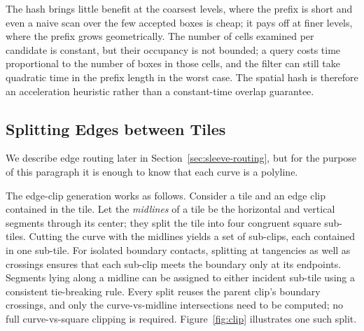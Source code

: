 \documentclass[review]{vgtc}          %
\begin{document}
The hash brings little benefit at the coarsest levels, where the
prefix is short and even a naive scan over the few accepted boxes is
cheap; it pays off at finer levels, where the prefix grows
geometrically. The number of cells examined per candidate is
constant, but their occupancy is not bounded; a query costs time
proportional to the number of boxes in those cells, and the filter
can still take quadratic time in the prefix length in the worst case.
The spatial hash is therefore an acceleration heuristic rather than
a constant-time overlap guarantee.


\subsection{Splitting Edges between Tiles}
\label{sec:tile-build}
We describe edge routing later in Section~\ref{sec:sleeve-routing}, but
for the purpose of this paragraph it is enough to know that each curve
is a polyline.

The edge-clip generation works as follows. Consider a tile and an edge
clip contained in the tile. Let the \emph{midlines} of a tile be the horizontal and
vertical segments through its center; they split the tile into four
congruent square sub-tiles. Cutting the curve with the midlines yields a set of
sub-clips, each contained in one sub-tile. For isolated boundary
contacts, splitting at tangencies as well as crossings ensures that
each sub-clip meets the boundary only at its endpoints. Segments
lying along a midline can be assigned to either incident sub-tile
using a consistent tie-breaking rule. Every split reuses the parent
clip's boundary crossings, and only the curve-vs-midline
intersections need to be computed; no full curve-vs-square clipping
is required. Figure~\ref{fig:clip} illustrates one such split.
\end{document}
